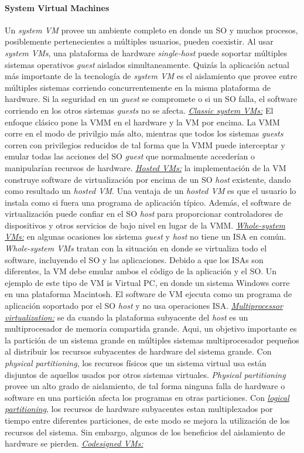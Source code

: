 \paragraph{\textnormal{\textbf{System Virtual Machines}}}
Un \emph{system VM} provee un ambiente completo en donde un SO y muchos procesos, posiblemente pertenecientes a múltiples usuarios, pueden coexistir. Al usar \emph{system VMs}, una plataforma de hardware \emph{single-host} puede soportar múltiples sistemas operativos \emph{guest} aislados simultaneamente. Quizás la aplicación actual más importante de la tecnología de \emph{system VM} es el aislamiento que provee entre múltiples sistemas corriendo concurrentemente en la misma plataforma de hardware. Si la seguridad en un \emph{guest} se compromete o si un SO falla, el software corriendo en los otros sistemas \emph{guests} no se afecta. \underline{\textit{Classic system VMs:}} El enfoque clásico pone la VMM en el hardware y la VM por encima. La VMM corre en el modo de privilgio más alto, mientras que todos los sistemas \emph{guests} corren con privilegios reducidos de tal forma que la VMM puede interceptar y emular todas las acciones del SO \emph{guest} que normalmente accederían o manipularían recursos de hardware. \underline{\textit{Hosted VMs:}} la implementación de la VM construye software de virtualización por encima de un SO \emph{host} existente, dando como resultado un \emph{hosted VM}. Una ventaja de un \emph{hosted VM} es que el usuario lo instala como si fuera una programa de aplicación típico. Además, el software de virtualización puede confiar en el SO \emph{host} para proporcionar controladores de dispositivos y otros servicios de bajo nivel en lugar de la VMM. \underline{\textit{Whole-system VMs:}} en algunas ocasiones los sistema \emph{guest} y \emph{host} no tiene un ISA en común. \emph{Whole-system VMs} tratan con la situación en donde se virtualiza todo el software, incluyendo el SO y las aplicaciones. Debido a que los ISAs son diferentes, la VM debe emular ambos el código de la aplicación y el SO.  Un ejemplo de este tipo de VM is Virtual PC, en donde un sistema Windows corre en una plataforma Macintosh. El software de VM ejecuta como un programa de aplicación soportado por el SO \emph{host} y no usa operaciones ISA. \underline{\textit{Multiprocessor virtualization:}} se da cuando la plataforma  subyacente del \emph{host} es un multiprocesador de memoria compartida grande. Aqui, un objetivo importante es la partición de un sistema grande en múltiples sistemas multiprocesador pequeños al distribuir los recursos subyacentes de hardware del sistema grande. Con \emph{physical partitioning}, los recursos físicos que un sistema virtual usa están disjuntos de aquellos usados por otros sistemas virtuales. \emph{Physical partitioning} provee un alto grado de aislamiento, de tal forma ninguna falla de hardware o software en una partición afecta los programas en otras particiones. Con \underline{\textit{logical partitioning}}, los recursos de hardware subyacentes estan multiplexados por tiempo entre diferentes particiones, de este modo se mejora la utilización de los recursos del sistema. Sin embargo, algunos de los beneficios del aislamiento de hardware se pierden. \underline{\textit{Codesigned VMs:}} 